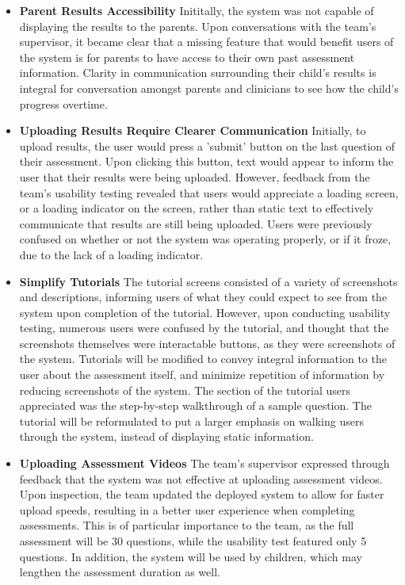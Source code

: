\documentclass[12pt, titlepage]{article}
\begin{document}
\begin{itemize}
  \item \textbf{Parent Results Accessibility} Inititally, the system was not capable of displaying the results to the parents. Upon conversations
    with the team's supervisor, it became clear that a missing feature that would benefit users of the system is for parents to have access to
    their own past assessment information. Clarity in communication surrounding their child's results is integral for conversation amongst
    parents and clinicians to see how the child's progress overtime.
  \item \textbf{Uploading Results Require Clearer Communication} Initially, to upload results, the user would press a 'submit' button on the last question
    of their assessment. Upon clicking this button, text would appear to inform the user that their results were being uploaded. However, feedback from
    the team's usability testing revealed that users would appreciate a loading screen, or a loading indicator on the screen, rather than static text
    to effectively communicate that results are still being uploaded. Users were previously confused on whether or not the system was operating properly,
    or if it froze, due to the lack of a loading indicator.
  \item \textbf{Simplify Tutorials} The tutorial screens consisted of a variety of screenshots and descriptions, informing users of what they could expect
    to see from the system upon completion of the tutorial. However, upon conducting usability testing, numerous users were confused by the tutorial,
    and thought that the screenshots themselves were interactable buttons, as they were screenshots of the system. Tutorials will be modified to convey
    integral information to the user about the assessment itself, and minimize repetition of information by reducing screenshots of the system. The section
    of the tutorial users appreciated was the step-by-step walkthrough of a sample question. The tutorial will be reformulated to put a larger emphasis on
    walking users through the system, instead of displaying static information.
  \item \textbf{Uploading Assessment Videos} The team's supervisor expressed through feedback that the system was not effective at uploading assessment videos.
    Upon inspection, the team updated the deployed system to allow for faster upload speeds, resulting in a better user experience when completing assessments.
    This is of particular importance to the team, as the full assessment will be 30 questions, while the usability test featured only 5 questions. In addition,
    the system will be used by children, which may lengthen the assessment duration as well.
\end{itemize}
\end{document}
